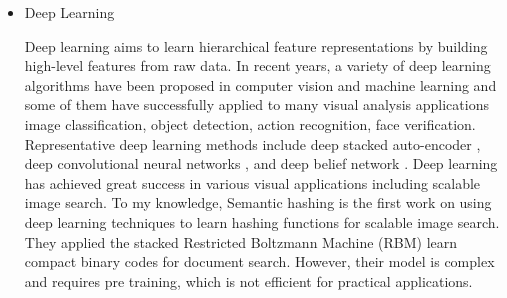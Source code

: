 \documentclass[12pt, a4paper,twoside]{article}
\begin{document}
\begin{itemize}
	\item Deep Learning

	Deep learning aims to learn hierarchical feature representations by building high-level features from raw 
	data. In recent years, a variety of deep learning algorithms have been proposed in computer vision and machine
	learning and some of them have successfully applied to many visual analysis
	applications image classification, object detection, action recognition, face verification. Representative deep 
	learning methods include deep stacked auto-encoder \cite{34}, deep convolutional neural networks \cite{28}, and deep belief network \cite{17}.
	Deep learning has achieved great success in various visual applications including scalable image search. To my knowledge,
	Semantic hashing \cite{56} is the first work on using deep learning techniques to learn hashing functions for scalable
	image search. They applied the stacked Restricted Boltzmann Machine (RBM) learn compact binary codes for document
	search. However, their model is complex and requires pre training, which is not efficient for practical applications.

\end{itemize}
\end{document}
